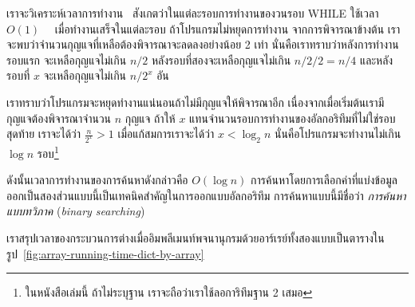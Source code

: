 เรา{\wbr}จะ{\wbr}วิเคราะห์{\wbr}เวลา{\wbr}การ{\wbr}ทำงาน \ สังเกต{\wbr}ว่า{\wbr}ใน{\wbr}แต่ละ{\wbr}รอบ{\wbr}การ{\wbr}ทำงาน{\wbr}ของ{\wbr}วน{\wbr}รอบ WHILE
ใช้เวลา $O(1)$ \ \ เมื่อ{\wbr}ทำงาน{\wbr}เสร็จ{\wbr}ใน{\wbr}แต่ละ{\wbr}รอบ ถ้า{\wbr}โปรแกรม{\wbr}ไม่{\wbr}หยุด{\wbr}การ{\wbr}ทำงาน{\wbr}
จาก{\wbr}การ{\wbr}พิจารณา{\wbr}ข้างต้น เรา{\wbr}จะ{\wbr}พบ{\wbr}ว่า{\wbr}จำนวน{\wbr}กุญแจ{\wbr}ที่{\wbr}เหลือ{\wbr}ต้อง{\wbr}พิจารณา{\wbr}จะ{\wbr}ลด{\wbr}ลง{\wbr}อย่าง{\wbr}น้อย 2 เท่า{\wbr}
นั่น{\wbr}คือ{\wbr}เรา{\wbr}ทราบ{\wbr}ว่า{\wbr}หลัง{\wbr}การ{\wbr}ทำงาน{\wbr}รอบ{\wbr}แรก จะ{\wbr}เหลือ{\wbr}กุญแจ{\wbr}ไม่{\wbr}เกิน $n/2$
หลัง{\wbr}รอบ{\wbr}ที่{\wbr}สอง{\wbr}จะ{\wbr}เหลือ{\wbr}กุญแจ{\wbr}ไม่{\wbr}เกิน $n/2/2 = n/4$ และ{\wbr}หลัง{\wbr}รอบ{\wbr}ที่ $x$ จะ{\wbr}เหลือ{\wbr}กุญแจ{\wbr}ไม่{\wbr}เกิน{\wbr}
$n/2^x$ อัน{\wbr}

เรา{\wbr}ทราบ{\wbr}ว่า{\wbr}โปรแกรม{\wbr}จะ{\wbr}หยุด{\wbr}ทำงาน{\wbr}แน่นอน{\wbr}ถ้า{\wbr}ไม่{\wbr}มี{\wbr}กุญแจ{\wbr}ให้{\wbr}พิจารณา{\wbr}อีก{\wbr}
เนื่องจาก{\wbr}เมื่อ{\wbr}เริ่มต้น{\wbr}เรา{\wbr}มี{\wbr}กุญแจ{\wbr}ต้อง{\wbr}พิจารณา{\wbr}จำนวน $n$ กุญแจ ถ้า{\wbr}ให้ $x$
แทน{\wbr}จำนวน{\wbr}รอบ{\wbr}การ{\wbr}ทำงาน{\wbr}ของ{\wbr}อัล{\wbr}กอ{\wbr}ริ{\wbr}ทึม{\wbr}ที่{\wbr}ไม่{\wbr}ใช่{\wbr}รอบ{\wbr}สุดท้าย เรา{\wbr}จะ{\wbr}ได้{\wbr}ว่า $\frac{n}{2^x} >
1$ เมื่อ{\wbr}แก้{\wbr}สมการ{\wbr}เรา{\wbr}จะ{\wbr}ได้{\wbr}ว่า $x < \log_2 n$ นั่น{\wbr}คือ{\wbr}โปรแกรม{\wbr}จะ{\wbr}ทำงาน{\wbr}ไม่{\wbr}เกิน $\log n$
รอบ\footnote{ใน{\wbr}หนังสือ{\wbr}เล่ม{\wbr}นี้ ถ้า{\wbr}ไม่{\wbr}ระบุ{\wbr}ฐาน เรา{\wbr}จะ{\wbr}ถือ{\wbr}ว่า{\wbr}เรา{\wbr}ใช้{\wbr}ลอการิทึม{\wbr}ฐาน 2 เสมอ}

ดังนั้น{\wbr}เวลา{\wbr}การ{\wbr}ทำงาน{\wbr}ของ{\wbr}การ{\wbr}ค้นหา{\wbr}ดังกล่าว{\wbr}คือ $O(\log n)$
การ{\wbr}ค้นหา{\wbr}โดย{\wbr}การ{\wbr}เลือก{\wbr}ค่า{\wbr}ที่{\wbr}แบ่ง{\wbr}ข้อมูล{\wbr}ออก{\wbr}เป็น{\wbr}สอง{\wbr}ส่วน{\wbr}แบบ{\wbr}นี้{\wbr}เป็น{\wbr}เทคนิค{\wbr}สำคัญ{\wbr}ใน{\wbr}การ{\wbr}ออกแบบ{\wbr}อัล{\wbr}กอ{\wbr}ริ{\wbr}ทึม{\wbr}
การ{\wbr}ค้นหา{\wbr}แบบ{\wbr}นี้{\wbr}มี{\wbr}ชื่อ{\wbr}ว่า {\em การ{\wbr}ค้นหา{\wbr}แบบ{\wbr}ทวิภาค} ({\em binary searching})

เรา{\wbr}สรุป{\wbr}เวลา{\wbr}ของ{\wbr}กระบวนการ{\wbr}ต่าง{\wbr}เมื่อ{\wbr}อิม{\wbr}พลี{\wbr}เมนท์{\wbr}พจนานุกรม{\wbr}ด้วย{\wbr}อาร์เรย์{\wbr}ทั้ง{\wbr}สอง{\wbr}แบบ{\wbr}เป็นตาราง{\wbr}ใน{\wbr}รูป~\ref{fig:array-running-time-dict-by-array}

